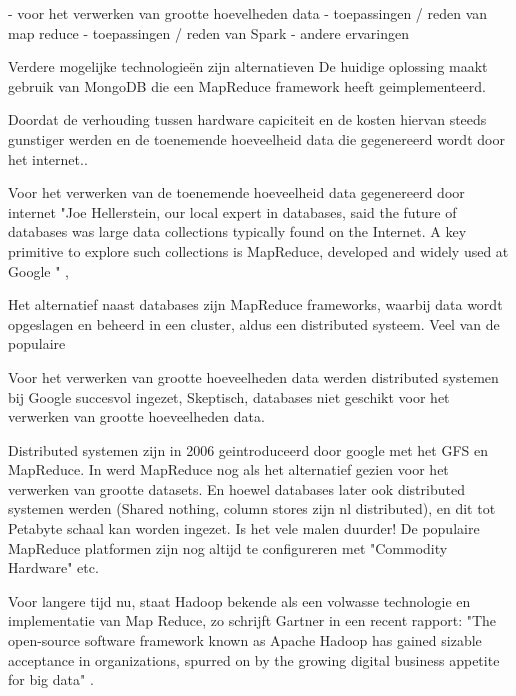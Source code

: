 

- voor het verwerken van grootte hoevelheden data
- toepassingen / reden van map reduce
- toepassingen / reden van Spark
- andere ervaringen

Verdere mogelijke technologieën zijn alternatieven 
De huidige oplossing maakt gebruik van MongoDB die een MapReduce framework heeft geimplementeerd.


Doordat de verhouding tussen hardware capiciteit en de kosten hiervan steeds gunstiger werden en de toenemende hoeveelheid data die gegenereerd wordt door het internet..

Voor het verwerken van de toenemende hoeveelheid data gegenereerd door  internet
"Joe Hellerstein, our local expert in databases, said the future of databases was large data
collections typically found on the Internet. A key primitive to explore such collections is
MapReduce, developed and widely used at Google \parencite{dean2008mapreduce}" \parencite{asanovic2006landscape}, 

Het alternatief naast databases zijn MapReduce frameworks, waarbij data wordt opgeslagen en beheerd in een cluster, aldus een distributed systeem. Veel van de populaire 

Voor het verwerken van grootte hoeveelheden data werden distributed systemen bij Google succesvol ingezet, 
Skeptisch, databases niet geschikt voor het verwerken van grootte hoeveelheden data. 

Distributed systemen zijn in 2006 geintroduceerd door google met het GFS en MapReduce. \parencite{dean2008mapreduce}
In \textcite{asanovic2006landscape} werd MapReduce nog als het alternatief gezien voor het verwerken van grootte datasets. En hoewel databases later ook distributed systemen werden (Shared nothing, column stores zijn nl distributed), en dit tot Petabyte schaal kan worden ingezet. \parencite{lamb2012vertica}
Is het vele malen duurder!
De populaire MapReduce platformen zijn nog altijd te configureren met "Commodity Hardware" etc. \parencite{dean2008mapreduce}


Voor langere tijd nu, staat Hadoop bekende als een volwasse technologie en implementatie van Map Reduce, zo schrijft Gartner in een recent rapport: "The open-source software framework known as Apache Hadoop has gained sizable acceptance in organizations, spurred on by the growing digital business appetite for big data" \parencite{hadoop2013selection}.

